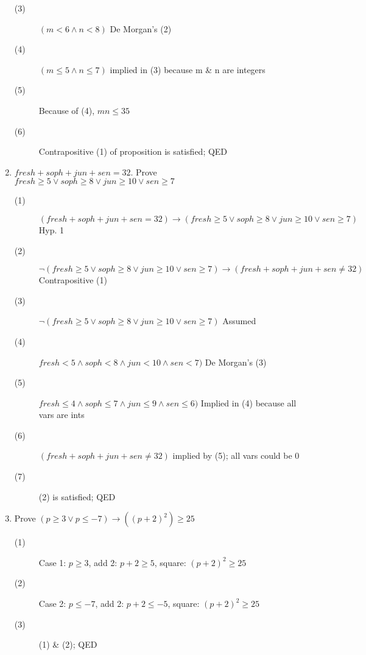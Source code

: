 \documentclass[11pt]{article}
\begin{document}
\begin{enumerate}
\begin{description}
                \item[(3)] $(m < 6 \land n < 8)$ \null\hfill De Morgan's (2)
                \item[(4)] $(m \leq 5 \land n \leq 7)$ \null\hfill implied in (3) because m \& n are integers
                \item[(5)] Because of (4), $mn \leq 35$
                \item[(6)] Contrapositive (1) of proposition is satisfied; QED
            \end{description}
        \item $fresh + soph + jun + sen = 32$. Prove $fresh \geq 5 \lor soph \geq 8 \lor jun \geq 10 \lor sen \geq 7$
            \begin{description}
                \item[(1)] $(fresh + soph + jun + sen = 32) \to (fresh \geq 5 \lor soph \geq 8 \lor jun \geq 10 \lor sen \geq 7)$ \null\hfill Hyp. 1
                \item[(2)] $\neg (fresh \geq 5 \lor soph \geq 8 \lor jun \geq 10 \lor sen \geq 7) \to (fresh + soph + jun + sen \neq 32)$ \\\null\hfill Contrapositive (1)
                \item[(3)] $\neg (fresh \geq 5 \lor soph \geq 8 \lor jun \geq 10 \lor sen \geq 7)$ \null\hfill Assumed
                \item[(4)] $fresh < 5 \land soph < 8 \land jun < 10 \land sen < 7)$ \null\hfill De Morgan's (3)
                \item[(5)] $fresh \leq 4 \land soph \leq 7 \land jun \leq 9 \land sen \leq 6)$ \null\hfill Implied in (4) because all vars are ints
                \item[(6)] $(fresh + soph + jun + sen \neq 32)$ implied by (5); all vars could be 0
                \item[(7)] (2) is satisfied; QED
            \end{description}
        \item Prove $(p \geq 3 \lor p \leq -7) \to ((p+2)^2) \geq 25$
            \begin{description}
                \item[(1)] Case 1: $p \geq 3$, add 2: $p+2 \geq 5$, square: $(p + 2)^2 \geq 25$
                \item[(2)] Case 2: $p \leq -7$, add 2: $p + 2 \leq -5$, square: $(p + 2)^2 \geq 25$
                \item[(3)] (1) \& (2); QED
            \end{description}

\end{enumerate}
\end{document}
